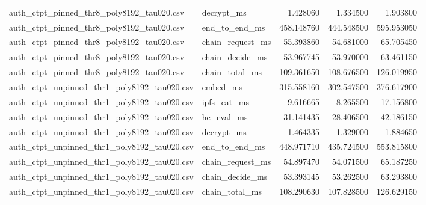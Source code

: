 \begin{tabular}{llrrr}
auth_ctpt_pinned_thr8_poly8192_tau020.csv & decrypt_ms & 1.428060 & 1.334500 & 1.903800 \\
auth_ctpt_pinned_thr8_poly8192_tau020.csv & end_to_end_ms & 458.148760 & 444.548500 & 595.953050 \\
auth_ctpt_pinned_thr8_poly8192_tau020.csv & chain_request_ms & 55.393860 & 54.681000 & 65.705450 \\
auth_ctpt_pinned_thr8_poly8192_tau020.csv & chain_decide_ms & 53.967745 & 53.970000 & 63.461150 \\
auth_ctpt_pinned_thr8_poly8192_tau020.csv & chain_total_ms & 109.361650 & 108.676500 & 126.019950 \\
auth_ctpt_unpinned_thr1_poly8192_tau020.csv & embed_ms & 315.558160 & 302.547500 & 376.617900 \\
auth_ctpt_unpinned_thr1_poly8192_tau020.csv & ipfs_cat_ms & 9.616665 & 8.265500 & 17.156800 \\
auth_ctpt_unpinned_thr1_poly8192_tau020.csv & he_eval_ms & 31.141435 & 28.406500 & 42.186150 \\
auth_ctpt_unpinned_thr1_poly8192_tau020.csv & decrypt_ms & 1.464335 & 1.329000 & 1.884650 \\
auth_ctpt_unpinned_thr1_poly8192_tau020.csv & end_to_end_ms & 448.971710 & 435.724500 & 553.815800 \\
auth_ctpt_unpinned_thr1_poly8192_tau020.csv & chain_request_ms & 54.897470 & 54.071500 & 65.187250 \\
auth_ctpt_unpinned_thr1_poly8192_tau020.csv & chain_decide_ms & 53.393145 & 53.262500 & 63.293800 \\
auth_ctpt_unpinned_thr1_poly8192_tau020.csv & chain_total_ms & 108.290630 & 107.828500 & 126.629150 \\
\bottomrule
\end{tabular}
